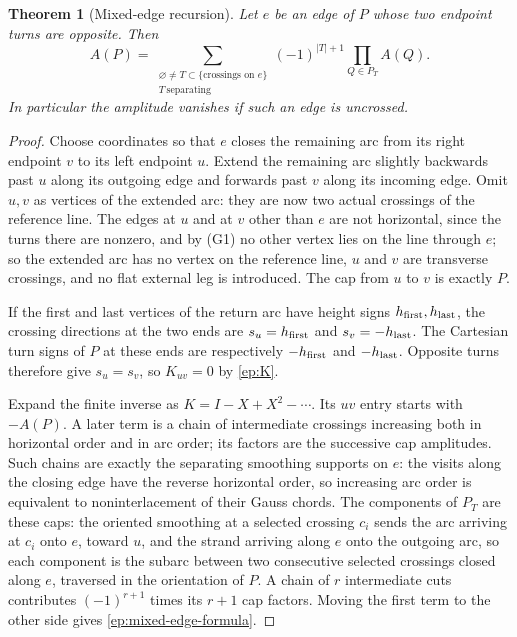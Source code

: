 \documentclass[11pt,letterpaper]{article}
\numberwithin{equation}{section}
\newtheorem{theorem}{Theorem}[section]
\theoremstyle{definition}
\theoremstyle{remark}
\begin{document}
\begin{theorem}[Mixed-edge recursion]
\label{ep:mixed-edge}
Let $e$ be an edge of $P$ whose two endpoint turns are opposite.  Then
\begin{equation}
 A(P)=\sum_{\substack{\varnothing\ne T\subset\{\text{crossings on }e\}\\
                         T\ \mathrm{separating}}}
 (-1)^{|T|+1}\prod_{Q\in P_T}A(Q).
 \label{ep:mixed-edge-formula}
\end{equation}
In particular the amplitude vanishes if such an edge is uncrossed.
\end{theorem}
\begin{proof}
Choose coordinates so that $e$ closes the remaining arc from its right
endpoint $v$ to its left endpoint $u$.  Extend the remaining arc slightly
backwards past $u$ along its outgoing edge and forwards past $v$ along its
incoming edge.  Omit $u,v$ as vertices of the extended arc: they are now
two actual crossings of the reference line.  The edges at $u$ and at $v$
other than $e$ are not horizontal, since the turns there are nonzero, and
by (G1) no other vertex lies on the line through $e$; so the extended arc
has no vertex on the reference line, $u$ and $v$ are transverse crossings,
and no flat external leg is introduced.  The cap from $u$ to $v$ is
exactly $P$.

If the first and last vertices of the return arc have height signs
$h_{\rm first},h_{\rm last}$, the crossing directions at the two ends
are $s_u=h_{\rm first}$ and $s_v=-h_{\rm last}$.  The Cartesian turn
signs of $P$ at these ends are respectively $-h_{\rm first}$ and
$-h_{\rm last}$.  Opposite turns therefore give $s_u=s_v$, so
$K_{uv}=0$ by \eqref{ep:K}.

Expand the finite inverse as $K=I-X+X^2-\cdots$.  Its $uv$ entry starts
with $-A(P)$.  A later term is a chain of intermediate crossings
increasing both in horizontal order and in arc order; its factors are the
successive cap amplitudes.  Such chains are exactly the separating
smoothing supports on $e$: the visits along the closing edge have the
reverse horizontal order, so increasing arc order is equivalent to
noninterlacement of their Gauss chords.  The components of $P_T$ are
these caps: the oriented smoothing at a selected crossing $c_i$ sends the
arc arriving at $c_i$ onto $e$, toward $u$, and the strand arriving along
$e$ onto the outgoing arc, so each component is the subarc between two
consecutive selected crossings closed along $e$, traversed in the
orientation of $P$.  A chain of $r$ intermediate cuts
contributes $(-1)^{r+1}$ times its $r+1$ cap factors.  Moving the first
term to the other side gives \eqref{ep:mixed-edge-formula}.
\end{proof}
\end{document}
